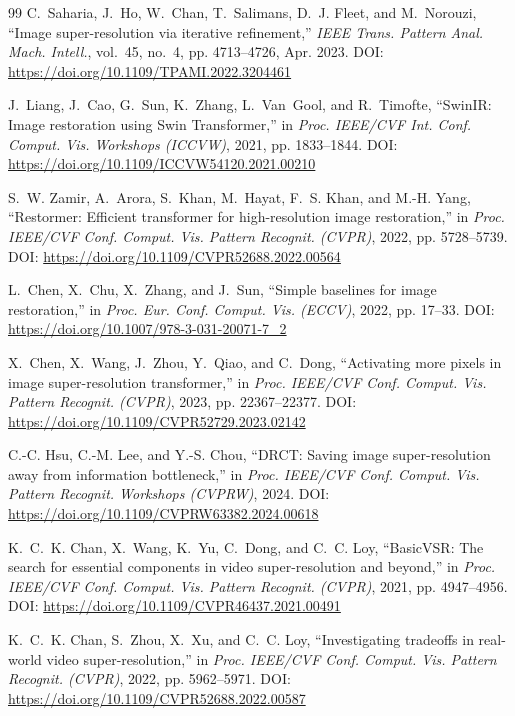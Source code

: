 \documentclass[10pt,onecolumn,journal]{IEEEtran}
\begin{document}
\begin{thebibliography}{99}
C.~Saharia, J.~Ho, W.~Chan, T.~Salimans, D.~J. Fleet, and M.~Norouzi, ``Image super-resolution via iterative refinement,'' \emph{IEEE Trans. Pattern Anal. Mach. Intell.}, vol.~45, no.~4, pp. 4713--4726, Apr. 2023. DOI: \url{https://doi.org/10.1109/TPAMI.2022.3204461}

J.~Liang, J.~Cao, G.~Sun, K.~Zhang, L.~Van~Gool, and R.~Timofte, ``SwinIR: Image restoration using Swin Transformer,'' in \emph{Proc. IEEE/CVF Int. Conf. Comput. Vis. Workshops (ICCVW)}, 2021, pp. 1833--1844. DOI: \url{https://doi.org/10.1109/ICCVW54120.2021.00210}

S.~W. Zamir, A.~Arora, S.~Khan, M.~Hayat, F.~S. Khan, and M.-H. Yang, ``Restormer: Efficient transformer for high-resolution image restoration,'' in \emph{Proc. IEEE/CVF Conf. Comput. Vis. Pattern Recognit. (CVPR)}, 2022, pp. 5728--5739. DOI: \url{https://doi.org/10.1109/CVPR52688.2022.00564}

L.~Chen, X.~Chu, X.~Zhang, and J.~Sun, ``Simple baselines for image restoration,'' in \emph{Proc. Eur. Conf. Comput. Vis. (ECCV)}, 2022, pp. 17--33. DOI: \url{https://doi.org/10.1007/978-3-031-20071-7_2}

X.~Chen, X.~Wang, J.~Zhou, Y.~Qiao, and C.~Dong, ``Activating more pixels in image super-resolution transformer,'' in \emph{Proc. IEEE/CVF Conf. Comput. Vis. Pattern Recognit. (CVPR)}, 2023, pp. 22367--22377. DOI: \url{https://doi.org/10.1109/CVPR52729.2023.02142}

C.-C. Hsu, C.-M. Lee, and Y.-S. Chou, ``DRCT: Saving image super-resolution away from information bottleneck,'' in \emph{Proc. IEEE/CVF Conf. Comput. Vis. Pattern Recognit. Workshops (CVPRW)}, 2024. DOI: \url{https://doi.org/10.1109/CVPRW63382.2024.00618}

K.~C.~K. Chan, X.~Wang, K.~Yu, C.~Dong, and C.~C. Loy, ``BasicVSR: The search for essential components in video super-resolution and beyond,'' in \emph{Proc. IEEE/CVF Conf. Comput. Vis. Pattern Recognit. (CVPR)}, 2021, pp. 4947--4956. DOI: \url{https://doi.org/10.1109/CVPR46437.2021.00491}

K.~C.~K. Chan, S.~Zhou, X.~Xu, and C.~C. Loy, ``Investigating tradeoffs in real-world video super-resolution,'' in \emph{Proc. IEEE/CVF Conf. Comput. Vis. Pattern Recognit. (CVPR)}, 2022, pp. 5962--5971. DOI: \url{https://doi.org/10.1109/CVPR52688.2022.00587}


\end{thebibliography}
\end{document}
